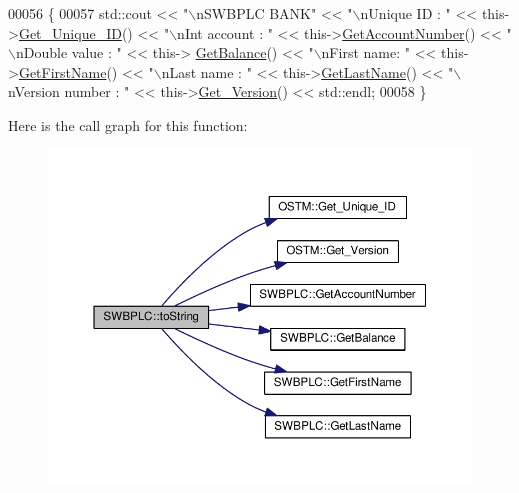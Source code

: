 \begin{DoxyCode}
00056 \{
00057      std::cout << \textcolor{stringliteral}{"\(\backslash\)nSWBPLC BANK"} << \textcolor{stringliteral}{"\(\backslash\)nUnique ID : "} << this->\hyperlink{class_o_s_t_m_a5a01a8b98d16b1d1904ecf9356e7b71d_a5a01a8b98d16b1d1904ecf9356e7b71d}{Get\_Unique\_ID}() << \textcolor{stringliteral}{"\(\backslash\)nInt
       account : "} << this->\hyperlink{class_s_w_b_p_l_c_a1a997f6d333e5021970e50605431d7df_a1a997f6d333e5021970e50605431d7df}{GetAccountNumber}() << \textcolor{stringliteral}{"\(\backslash\)nDouble value : "} << this->
      \hyperlink{class_s_w_b_p_l_c_af7f5f662ab926bfb9c0c1c7156cde24c_af7f5f662ab926bfb9c0c1c7156cde24c}{GetBalance}() << \textcolor{stringliteral}{"\(\backslash\)nFirst name: "} << this->\hyperlink{class_s_w_b_p_l_c_ace6bbcd6546896e581e3a2ee9504d090_ace6bbcd6546896e581e3a2ee9504d090}{GetFirstName}() << \textcolor{stringliteral}{"\(\backslash\)nLast name : "} << 
      this->\hyperlink{class_s_w_b_p_l_c_a72b2595acea28dae9e4f5816dd3c4652_a72b2595acea28dae9e4f5816dd3c4652}{GetLastName}()  << \textcolor{stringliteral}{"\(\backslash\)nVersion number : "} << this->\hyperlink{class_o_s_t_m_a1f1db9d482f22c8e7caa17dfb340626b_a1f1db9d482f22c8e7caa17dfb340626b}{Get\_Version}() << std::endl;
00058 \}
\end{DoxyCode}


Here is the call graph for this function\+:\nopagebreak
\begin{figure}[H]
\begin{center}
\leavevmode
\includegraphics[width=350pt]{class_s_w_b_p_l_c_a761c77b5a204b4ae05ffb01bd602c3c2_a761c77b5a204b4ae05ffb01bd602c3c2_cgraph}
\end{center}
\end{figure}




